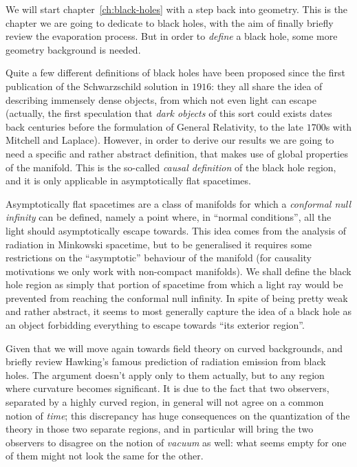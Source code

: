 We will start chapter~\ref{ch:black-holes} with a step back into geometry. This is the chapter we are going to dedicate to black holes, with the aim of finally briefly review the evaporation process. But in order to \emph{define} a black hole, some more geometry background is needed. 

Quite a few different definitions of black holes have been proposed since the first publication of the Schwarzschild solution in \(1916\): they all share the idea of describing immensely dense objects, from which not even light can escape (actually, the first speculation that \emph{dark objects} of this sort could exists dates back centuries before the formulation of General Relativity, to the late \(1700\)s with Mitchell and Laplace). However, in order to derive our results we are going to need a specific and rather abstract definition, that makes use of global properties of the manifold. This is the so-called \emph{causal definition} of the black hole region, and it is only applicable in asymptotically flat spacetimes.

Asymptotically flat spacetimes are a class of manifolds for which a \emph{conformal null infinity} can be defined, namely a point where, in ``normal conditions'', all the light should asymptotically escape towards. This idea comes from the analysis of radiation in Minkowski spacetime, but to be generalised it requires some restrictions on the ``asymptotic'' behaviour of the manifold (for causality motivations we only work with non-compact manifolds). We shall define the black hole region as simply that portion of spacetime from which a light ray would be prevented from reaching the conformal null infinity. In spite of being pretty weak and rather abstract, it seems to most generally capture the idea of a black hole as an object forbidding everything to escape towards ``its exterior region''.

Given that we will move again towards field theory on curved backgrounds, and briefly review Hawking's famous prediction of radiation emission from black holes. The argument doesn't apply only to them actually, but to any region where curvature becomes significant. It is due to the fact that two observers, separated by a highly curved region, in general will not agree on a common notion of \emph{time}; this discrepancy has huge consequences on the quantization of the theory in those two separate regions, and in particular will bring the two observers to disagree on the notion of \emph{vacuum} as well: what seems empty for one of them might not look the same for the other. 

